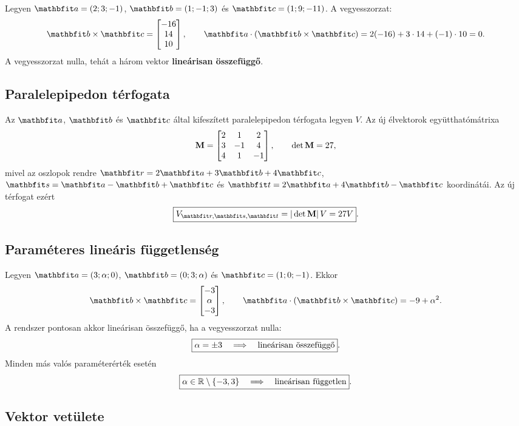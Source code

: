 \documentclass{szb-solution}
\begin{document}
Legyen $\rvec a=(2;3;-1)$, $\rvec b=(1;-1;3)$ és
$\rvec c=(1;9;-11)$. A vegyesszorzat:
$$
  \rvec b\times\rvec c
  =\begin{bmatrix}-16\\14\\10\end{bmatrix},
  \qquad
  \rvec a\cdot(\rvec b\times\rvec c)
  =2(-16)+3\cdot14+(-1)\cdot10=0
  \text.
$$
A vegyesszorzat nulla, tehát a három vektor
\textbf{lineárisan összefüggő}.

\subsection{Paralelepipedon térfogata}

Az $\rvec a$, $\rvec b$ és $\rvec c$ által kifeszített paralelepipedon
térfogata legyen $V$. Az új élvektorok együtthatómátrixa
$$
  \mathbf{M}=
  \begin{bmatrix}
    2&1&2\\
    3&-1&4\\
    4&1&-1
  \end{bmatrix},
  \qquad
  \det\mathbf{M}=27
  \text,
$$
mivel az oszlopok rendre
$\rvec r=2\rvec a+3\rvec b+4\rvec c$,
$\rvec s=\rvec a-\rvec b+\rvec c$ és
$\rvec t=2\rvec a+4\rvec b-\rvec c$ koordinátái.
Az új térfogat ezért
$$
  \boxed{V_{\rvec r,\rvec s,\rvec t}
  =|\det\rmat M|\,V=27V}
  \text.
$$

\subsection{Paraméteres lineáris függetlenség}

Legyen $\rvec a=(3;\alpha;0)$, $\rvec b=(0;3;\alpha)$ és
$\rvec c=(1;0;-1)$. Ekkor
$$
  \rvec b\times\rvec c
  =\begin{bmatrix}-3\\\alpha\\-3\end{bmatrix},
  \qquad
  \rvec a\cdot(\rvec b\times\rvec c)
  =-9+\alpha^2
  \text.
$$
A rendszer pontosan akkor lineárisan összefüggő, ha a vegyesszorzat nulla:
$$
  \boxed{\alpha=\pm3
  \quad\Longrightarrow\quad
  \text{lineárisan összefüggő}}
  \text.
$$
Minden más valós paraméterérték esetén
$$
  \boxed{\alpha\in\mathbb{R}\setminus\{-3,3\}
  \quad\Longrightarrow\quad
  \text{lineárisan független}}
  \text.
$$

\subsection{Vektor vetülete}
\end{document}
